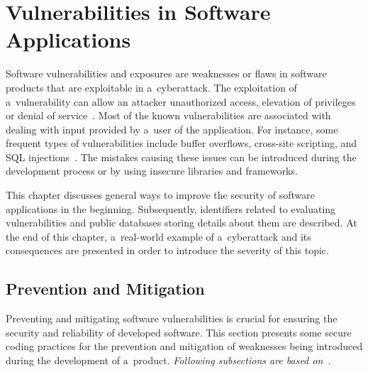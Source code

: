 
\chapter{Vulnerabilities in Software Applications}
\label{chapter:vulnerabilities}
  Software vulnerabilities and exposures are weaknesses or flaws in software products that are
  exploitable in a~cyberattack. The exploitation of a~vulnerability can allow an attacker unauthorized
  access, elevation of privileges or denial of service~\cite{SoftwareVulnerabilities}.
  Most of the known vulnerabilities are associated with dealing with input provided by a~user
  of the application. For instance, some frequent types of vulnerabilities include buffer overflows,
  cross-site scripting, and SQL injections~\cite{vulnerabilities}. The mistakes causing these issues
  can be introduced during the development process or by using insecure libraries and frameworks.

  This chapter discusses general ways to improve the security of software applications in the beginning.
  Subsequently, identifiers related to evaluating vulnerabilities and public databases storing details about them
  are described. At the end of this chapter, a~real-world example of a~cyberattack and its consequences
  are presented in order to introduce the severity of this topic.

  \section{Prevention and Mitigation}
  Preventing and mitigating software vulnerabilities is crucial for ensuring the security and reliability
  of developed software. This section presents some secure coding practices for the prevention
  and mitigation of weaknesses being introduced during the development of a~product.
  \textit{Following subsections are based on~\cite{SecureCodingPractices}.}

